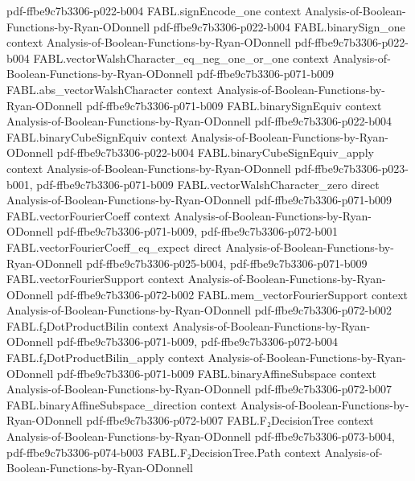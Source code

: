\begin{theorem}
  {pdf-ffbe9c7b3306-p022-b004}
\proofstep
  {FABL.signEncode_one}
  {context}
  {Analysis-of-Boolean-Functions-by-Ryan-ODonnell}
  {pdf-ffbe9c7b3306-p022-b004}
\proofstep
  {FABL.binarySign_one}
  {context}
  {Analysis-of-Boolean-Functions-by-Ryan-ODonnell}
  {pdf-ffbe9c7b3306-p022-b004}
\proofstep
  {FABL.vectorWalshCharacter_eq_neg_one_or_one}
  {context}
  {Analysis-of-Boolean-Functions-by-Ryan-ODonnell}
  {pdf-ffbe9c7b3306-p071-b009}
\proofstep
  {FABL.abs_vectorWalshCharacter}
  {context}
  {Analysis-of-Boolean-Functions-by-Ryan-ODonnell}
  {pdf-ffbe9c7b3306-p071-b009}
\proofstep
  {FABL.binarySignEquiv}
  {context}
  {Analysis-of-Boolean-Functions-by-Ryan-ODonnell}
  {pdf-ffbe9c7b3306-p022-b004}
\proofstep
  {FABL.binaryCubeSignEquiv}
  {context}
  {Analysis-of-Boolean-Functions-by-Ryan-ODonnell}
  {pdf-ffbe9c7b3306-p022-b004}
\proofstep
  {FABL.binaryCubeSignEquiv_apply}
  {context}
  {Analysis-of-Boolean-Functions-by-Ryan-ODonnell}
  {pdf-ffbe9c7b3306-p023-b001,
    pdf-ffbe9c7b3306-p071-b009}
\proofstep
  {FABL.vectorWalshCharacter_zero}
  {direct}
  {Analysis-of-Boolean-Functions-by-Ryan-ODonnell}
  {pdf-ffbe9c7b3306-p071-b009}
\proofstep
  {FABL.vectorFourierCoeff}
  {context}
  {Analysis-of-Boolean-Functions-by-Ryan-ODonnell}
  {pdf-ffbe9c7b3306-p071-b009,
    pdf-ffbe9c7b3306-p072-b001}
\proofstep
  {FABL.vectorFourierCoeff_eq_expect}
  {direct}
  {Analysis-of-Boolean-Functions-by-Ryan-ODonnell}
  {pdf-ffbe9c7b3306-p025-b004,
    pdf-ffbe9c7b3306-p071-b009}
\proofstep
  {FABL.vectorFourierSupport}
  {context}
  {Analysis-of-Boolean-Functions-by-Ryan-ODonnell}
  {pdf-ffbe9c7b3306-p072-b002}
\proofstep
  {FABL.mem_vectorFourierSupport}
  {context}
  {Analysis-of-Boolean-Functions-by-Ryan-ODonnell}
  {pdf-ffbe9c7b3306-p072-b002}
\proofstep
  {FABL.f₂DotProductBilin}
  {context}
  {Analysis-of-Boolean-Functions-by-Ryan-ODonnell}
  {pdf-ffbe9c7b3306-p071-b009,
    pdf-ffbe9c7b3306-p072-b004}
\proofstep
  {FABL.f₂DotProductBilin_apply}
  {context}
  {Analysis-of-Boolean-Functions-by-Ryan-ODonnell}
  {pdf-ffbe9c7b3306-p071-b009}
\proofstep
  {FABL.binaryAffineSubspace}
  {context}
  {Analysis-of-Boolean-Functions-by-Ryan-ODonnell}
  {pdf-ffbe9c7b3306-p072-b007}
\proofstep
  {FABL.binaryAffineSubspace_direction}
  {context}
  {Analysis-of-Boolean-Functions-by-Ryan-ODonnell}
  {pdf-ffbe9c7b3306-p072-b007}
\proofstep
  {FABL.F₂DecisionTree}
  {context}
  {Analysis-of-Boolean-Functions-by-Ryan-ODonnell}
  {pdf-ffbe9c7b3306-p073-b004,
    pdf-ffbe9c7b3306-p074-b003}
\proofstep
  {FABL.F₂DecisionTree.Path}
  {context}
  {Analysis-of-Boolean-Functions-by-Ryan-ODonnell}

\end{theorem}

